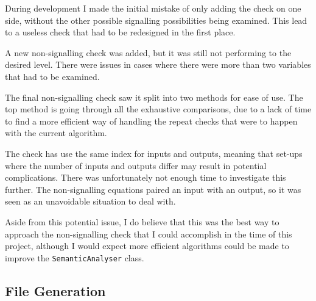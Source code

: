 \documentclass[report.tex]{subfiles}
\begin{document}
During development I made the initial mistake of only adding the check on one
side, without the other possible signalling possibilities being examined. This
lead to a useless check that had to be redesigned in the first place.

A new non-signalling check was added, but it was still not performing to the
desired level. There were issues in cases where there were more than two
variables that had to be examined.



The final non-signalling check saw it split into two methods for ease of use.
The top method is going through all the exhaustive comparisons, due to a lack of
time to find a more efficient way of handling the repeat checks that were to
happen with the current algorithm. 

The check has use the same index for inputs and outputs, meaning that set-ups
where the number of inputs and outputs differ may result in potential
complications. There was unfortunately not enough time to investigate this
further. The non-signalling equations paired an input with an output, so it was
seen as an unavoidable situation to deal with.

Aside from this potential issue, I do believe that this was the best way to
approach the non-signalling check that I could accomplish in the time of this
project, although I would expect more efficient algorithms could be made to
improve the \texttt{SemanticAnalyser} class.

\subsection{File Generation} %
\label{sub:file_generation}

\newpage
\end{document}
